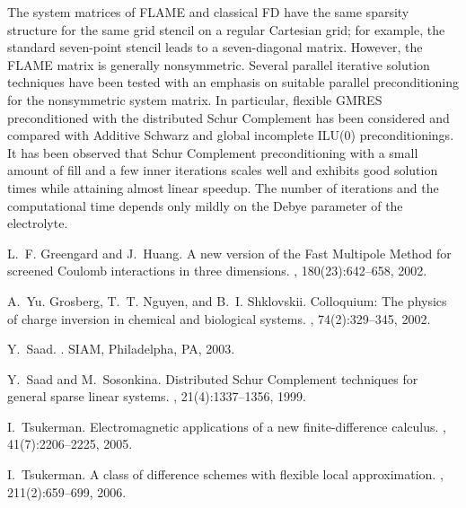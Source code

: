 \documentclass{report}
\begin{document}
The system matrices of FLAME and classical FD have the same sparsity
structure for the same grid stencil on a regular Cartesian grid; for
example, the standard seven-point stencil leads to a seven-diagonal
matrix.  However, the FLAME matrix is generally nonsymmetric.
Several parallel iterative solution techniques have been tested with an
emphasis on suitable parallel preconditioning for the nonsymmetric 
system matrix. In particular, flexible GMRES \cite{saad03iterative}
preconditioned with the distributed Schur Complement
\cite{saad-sosonkina-pschur} has been considered and compared with
Additive Schwarz and global incomplete ILU(0) preconditionings.
It has been observed that Schur Complement preconditioning with a small 
amount of fill and a few inner iterations scales well and exhibits good 
solution times while attaining
almost linear speedup. The number of iterations and the computational time
depends only mildly on the Debye parameter of the electrolyte.


\begin{thebibliography}{1}

L.~F. Greengard and J.~Huang.
\newblock A new version of the {Fast Multipole Method} for screened {Coulomb}
  interactions in three dimensions.
, 180(23):642--658, 2002.

A.~Yu. Grosberg, T.~T. Nguyen, and B.~I. Shklovskii.
\newblock Colloquium: The physics of charge inversion in chemical and
  biological systems.
, 74(2):329--345, 2002.

Y.~Saad.
.
\newblock SIAM, Philadelpha, PA, 2003.

Y.~Saad and M.~Sosonkina.
\newblock Distributed {Schur Complement} techniques for general sparse linear
  systems.
, 21(4):1337--1356, 1999.

I.~Tsukerman.
\newblock Electromagnetic applications of a new finite-difference calculus.
, 41(7):2206--2225, 2005.

I.~Tsukerman.
\newblock A class of difference schemes with flexible local approximation.
, 211(2):659--699, 2006.

\end{thebibliography}
\end{document}
